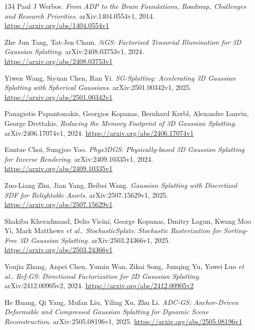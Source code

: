 \documentclass[11pt,a4paper]{article}
\begin{document}
\begin{thebibliography}{134}
Paul J Werbos.
\newblock \emph{From ADP to the Brain Foundations, Roadmap, Challenges and Research Priorities}.
\newblock arXiv:1404.0554v1, 2014.
\newblock \url{https://arxiv.org/abs/1404.0554v1}

Zhe Jun Tang, Tat-Jen Cham.
\newblock \emph{3iGS: Factorised Tensorial Illumination for 3D Gaussian Splatting}.
\newblock arXiv:2408.03753v1, 2024.
\newblock \url{https://arxiv.org/abs/2408.03753v1}

Yiwen Wang, Siyuan Chen, Ran Yi.
\newblock \emph{SG-Splatting: Accelerating 3D Gaussian Splatting with Spherical Gaussians}.
\newblock arXiv:2501.00342v1, 2025.
\newblock \url{https://arxiv.org/abs/2501.00342v1}

Panagiotis Papantonakis, Georgios Kopanas, Bernhard Kerbl, Alexandre Lanvin, George Drettakis.
\newblock \emph{Reducing the Memory Footprint of 3D Gaussian Splatting}.
\newblock arXiv:2406.17074v1, 2024.
\newblock \url{https://arxiv.org/abs/2406.17074v1}

Euntae Choi, Sungjoo Yoo.
\newblock \emph{Phys3DGS: Physically-based 3D Gaussian Splatting for Inverse Rendering}.
\newblock arXiv:2409.10335v1, 2024.
\newblock \url{https://arxiv.org/abs/2409.10335v1}

Zuo-Liang Zhu, Jian Yang, Beibei Wang.
\newblock \emph{Gaussian Splatting with Discretized SDF for Relightable Assets}.
\newblock arXiv:2507.15629v1, 2025.
\newblock \url{https://arxiv.org/abs/2507.15629v1}

Shakiba Kheradmand, Delio Vicini, George Kopanas, Dmitry Lagun, Kwang Moo Yi, Mark Matthews \emph{et al.}.
\newblock \emph{StochasticSplats: Stochastic Rasterization for Sorting-Free 3D Gaussian Splatting}.
\newblock arXiv:2503.24366v1, 2025.
\newblock \url{https://arxiv.org/abs/2503.24366v1}

Youjia Zhang, Anpei Chen, Yumin Wan, Zikai Song, Junqing Yu, Yawei Luo \emph{et al.}.
\newblock \emph{Ref-GS: Directional Factorization for 2D Gaussian Splatting}.
\newblock arXiv:2412.00905v2, 2024.
\newblock \url{https://arxiv.org/abs/2412.00905v2}

He Huang, Qi Yang, Mufan Liu, Yiling Xu, Zhu Li.
\newblock \emph{ADC-GS: Anchor-Driven Deformable and Compressed Gaussian Splatting for Dynamic Scene Reconstruction}.
\newblock arXiv:2505.08196v1, 2025.
\newblock \url{https://arxiv.org/abs/2505.08196v1}


\end{thebibliography}
\end{document}
